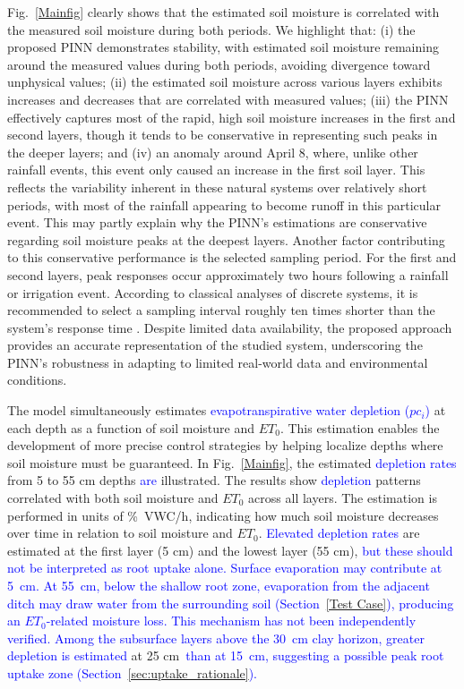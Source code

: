\documentclass[pdflatex,sn-nature]{sn-jnl}%
\theoremstyle{thmstyleone}%
\theoremstyle{thmstyletwo}%
\theoremstyle{thmstylethree}%
\begin{document}
Fig.~\ref{Mainfig} clearly shows that the estimated soil moisture is correlated with the measured soil moisture during both periods. We highlight that: (i) the proposed PINN demonstrates stability, with estimated soil moisture remaining around the measured values during both periods, avoiding divergence toward unphysical values; (ii) the estimated soil moisture across various layers exhibits increases and decreases that are correlated with measured values; (iii) the PINN effectively captures most of the rapid, high soil moisture increases in the first and second layers, though it tends to be conservative in representing such peaks in the deeper layers; and (iv) an anomaly around April 8, where, unlike other rainfall events, this event only caused an increase in the first soil layer. This reflects the variability inherent in these natural systems over relatively short periods, with most of the rainfall appearing to become runoff in this particular event. This may partly explain why the PINN’s estimations are conservative regarding soil moisture peaks at the deepest layers. Another factor contributing to this conservative performance is the selected sampling period. For the first and second layers, peak responses occur approximately two hours following a rainfall or irrigation event. According to classical analyses of discrete systems, it is recommended to select a sampling interval roughly ten times shorter than the system's response time \cite{Franklin1998}. Despite limited data availability, the proposed approach provides an accurate representation of the studied system, underscoring the PINN's robustness in adapting to limited real-world data and environmental conditions.

The model simultaneously estimates \textcolor{blue}{evapotranspirative water depletion ($pc_i$)} at each depth as a function of soil moisture and $ET_0$. This estimation enables the development of more precise control strategies by helping localize depths where soil moisture must be guaranteed. In Fig.~\ref{Mainfig}, the estimated \textcolor{blue}{depletion rates} from 5 to 55 \si{cm} depths \textcolor{blue}{are} illustrated. The results show \textcolor{blue}{depletion} patterns correlated with both soil moisture and $ET_0$ across all layers. The estimation is performed in units of \si{\%VWC/h}, indicating how much soil moisture decreases over time in relation to soil moisture and $ET_0$. \textcolor{blue}{Elevated depletion rates} are estimated at the first layer (5 \si{cm}) and the lowest layer (55 \si{cm}), \textcolor{blue}{but these should not be interpreted as root uptake alone. Surface evaporation may contribute at 5~\si{cm}. At 55~\si{cm}, below the shallow root zone, evaporation from the adjacent ditch may draw water from the surrounding soil (Section~\ref{Test Case}), producing an $ET_0$-related moisture loss. This mechanism has not been independently verified. Among the subsurface layers above the \SI{30}{cm} clay horizon, greater depletion is estimated} at 25 \si{cm}\textcolor{blue}{~than at 15~\si{cm}, suggesting a possible peak root uptake zone (Section~\ref{sec:uptake_rationale}).}
\end{document}
